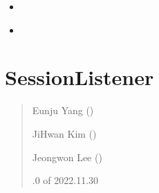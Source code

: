 \documentclass[a4paper,10pt,english]{sphinxmanual}
\begin{document}
\begin{fulllineitems}
\begin{fulllineitems}
\begin{quote}
\begin{description}
\end{description}\end{quote}


\nopagebreak

\begin{itemize}
\item {} 
\sphinxAtStartPar
{\hyperref[\detokenize{_SessionListener:SessionListener._requestSN}]{}}

\item {} 
\sphinxAtStartPar
{\hyperref[\detokenize{_SessionListener:SessionListener._ackSN}]{}}

\end{itemize}



\end{fulllineitems}


\begin{fulllineitems}
\label{\detokenize{_SessionRequester:SessionRequester.run}}
\pysigstartsignatures
{}
\pysigstopsignatures
\end{fulllineitems}


\end{fulllineitems}


\sphinxstepscope


\section{SessionListener}
\label{\detokenize{_SessionListener:sessionlistener}}\label{\detokenize{_SessionListener:id1}}\label{\detokenize{_SessionListener::doc}}\begin{quote}\begin{description}
\begin{DUlineblock}{0em}
\item[] Eunju Yang ()
\item[] JiHwan Kim ()
\item[] Jeongwon Lee ()
\end{DUlineblock}

.0 of 2022.11.30

\end{description}\end{quote}
\end{document}
